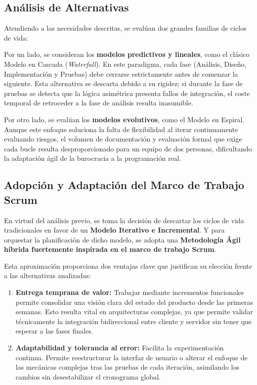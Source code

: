 \subsection{Análisis de Alternativas}
Atendiendo a las necesidades descritas, se evalúan dos grandes familias de ciclos de vida:

Por un lado, se consideran los \textbf{modelos predictivos y lineales}, como el clásico Modelo en Cascada (\textit{Waterfall}). En este paradigma, cada fase (Análisis, Diseño, Implementación y Pruebas) debe cerrarse estrictamente antes de comenzar la siguiente. Esta alternativa se descarta debido a su rigidez; si durante la fase de pruebas se detecta que la lógica asimétrica presenta fallos de integración, el coste temporal de retroceder a la fase de análisis resulta inasumible.

Por otro lado, se evalúan los \textbf{modelos evolutivos}, como el Modelo en Espiral. Aunque este enfoque soluciona la falta de flexibilidad al iterar continuamente evaluando riesgos, el volumen de documentación y evaluación formal que exige cada bucle resulta desproporcionado para un equipo de dos personas, dificultando la adaptación ágil de la burocracia a la programación real.

\subsection{Adopción y Adaptación del Marco de Trabajo Scrum}
En virtud del análisis previo, se toma la decisión de descartar los ciclos de vida tradicionales en favor de un \textbf{Modelo Iterativo e Incremental}. Y para orquestar la planificación de dicho modelo, se adopta una \textbf{Metodología Ágil híbrida fuertemente inspirada en el marco de trabajo Scrum}.

Esta aproximación proporciona dos ventajas clave que justifican su elección frente a las alternativas analizadas:

\begin{enumerate}
    \item \textbf{Entrega temprana de valor:} Trabajar mediante incrementos funcionales permite consolidar una visión clara del estado del producto desde las primeras semanas. Esto resulta vital en arquitecturas complejas, ya que permite validar técnicamente la integración bidireccional entre cliente y servidor sin tener que esperar a las fases finales.
    \item \textbf{Adaptabilidad y tolerancia al error:} Facilita la experimentación continua. Permite reestructurar la interfaz de usuario o alterar el enfoque de las mecánicas complejas tras las pruebas de cada iteración, asimilando los cambios sin desestabilizar el cronograma global.
\end{enumerate}

